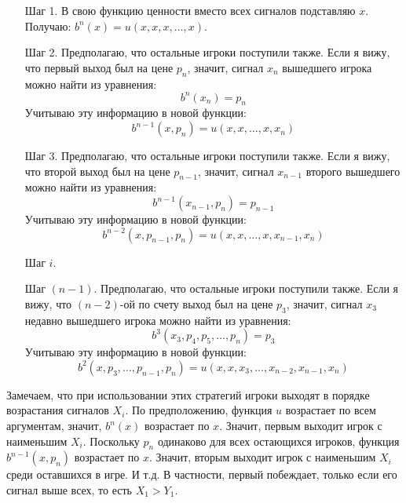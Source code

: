 \begin{itemize}
\begin{enumerate}
\item[Шаг 1.] В свою функцию ценности вместо всех сигналов подставляю $ x $. Получаю: $b^{n}(x)=u(x,x,x,\ldots,x)$.
\item[Шаг 2.] Предполагаю, что остальные игроки поступили также. Если я вижу, что первый выход был на цене $ p_{n} $, значит, сигнал $x_{n}  $ вышедшего игрока можно найти из уравнения:
\begin{equation}
b^{n}(x_{n})=p_{n}
\end{equation}
Учитываю эту информацию в новой функции:
\begin{equation}
b^{n-1}(x,p_{n})=u(x,x,\ldots,x,x_{n})
\end{equation}
\item[Шаг 3.] Предполагаю, что остальные игроки поступили также. Если я вижу, что второй выход был на цене $ p_{n-1} $, значит, сигнал $ x_{n-1} $ второго вышедшего можно найти из уравнения:
\begin{equation}
b^{n-1}(x_{n-1},p_{n})=p_{n-1}
\end{equation}
Учитываю эту информацию в новой функции:
\begin{equation}
b^{n-2}(x,p_{n-1},p_{n})=u(x,x,\ldots,x,x_{n-1},x_{n})
\end{equation}
\item[Шаг $ i $.]

\item[Шаг $ (n-1) $.] Предполагаю, что остальные игроки поступили также. Если я вижу, что $ (n-2) $-ой по счету выход был на цене $ p_{3} $, значит, сигнал $ x_{3} $ недавно вышедшего игрока можно найти из уравнения:
\begin{equation}
b^{3}(x_{3},p_{4},p_{5},\ldots,p_{n})=p_{3}
\end{equation}
Учитываю эту информацию в новой функции:
\begin{equation}
b^{2}(x,p_{3},\ldots,p_{n-1},p_{n})=u(x,x,x_{3},\ldots,x_{n-2},x_{n-1},x_{n})
\end{equation}

\end{enumerate}

Замечаем, что при использовании этих стратегий игроки выходят в порядке возрастания сигналов $ X_{i} $. По предположению, функция $ u $ возрастает по всем аргументам, значит, $ b^{n}(x) $ возрастает по $ x $. Значит, первым выходит игрок с наименьшим $ X_{i} $. Поскольку $ p_{n} $ одинаково для всех остающихся игроков, функция $ b^{n-1}(x,p_{n}) $ возрастает по $ x $. Значит, вторым выходит игрок с наименьшим $ X_{i} $ среди оставшихся в игре. И т.д. В частности, первый побеждает, только если его сигнал выше всех, то есть $ X_{1}>Y_{1} $.


\end{itemize}
